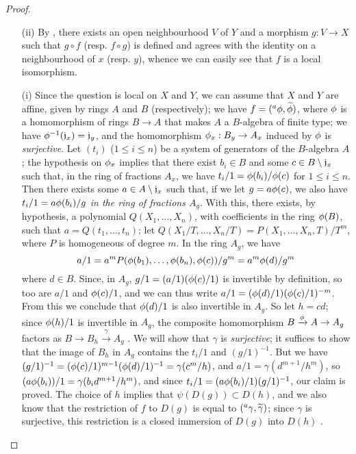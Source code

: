\begin{proof}
\label{proof-1.6.5.4}
\medskip\noindent
\begin{enumerate}
    \item[(ii)] By , there exists an open neighbourhood $V$ of $Y$ and a morphism $g:V\to X$ such that $g\circ f$ (resp. $f\circ g$) is defined and agrees with the identity on a neighbourhood of $x$ (resp. $y$), whence we can easily see that $f$ is a local isomorphism.
    \item[(i)] Since the question is local on $X$ and $Y$, we can assume that $X$ and $Y$ are affine, given by rings $A$ and $B$ (respectively);
    we have $f=({}^a\phi,\widetilde{\phi})$, where $\phi$ is a homomorphism of rings $B\to A$ that makes $A$ a $B$-algebra of finite type;
    we have $\phi^{-1}(\mathfrak{j}_x)=\mathfrak{j}_y$, and the homomorphism $\phi_x:B_y\to A_x$ induced by $\phi$ is \emph{surjective}.
    Let $(t_i)$ ($1\leqslant i\leqslant n$) be a system of generators of the $B$-algebra $A$;
    the hypothesis on $\phi_x$ implies that there exist $b_i\in B$ and some $c\in B\setminus\mathfrak{j}_x$ such that, in the ring of fractions $A_x$, we have $t_i/1=\phi(b_i)/\phi(c)$ for $1\leqslant i\leqslant n$.
    Then  there exists some $a\in A\setminus\mathfrak{j}_x$ such that, if we let $g=a\phi(c)$, we also have $t_i/1=a\phi(b_i)/g$ \emph{in the ring of fractions $A_g$}.
    With this, there exists, by hypothesis, a polynomial $Q(X_1,\ldots,X_n)$, with coefficients in the ring $\phi(B)$, such that $a=Q(t_1,\ldots,t_n)$;
    let $Q(X_1/T,\ldots,X_n/T)=P(X_1,\ldots,X_n,T)/T^m$, where $P$ is homogeneous of degree $m$.
    In the ring $A_g$, we have
    \[
      a/1=a^mP(\phi(b_1),\ldots,\phi(b_n),\phi(c))/g^m=a^m\phi(d)/g^m
    \]
    where $d\in B$.
    Since, in $A_g$, $g/1=(a/1)(\phi(c)/1)$ is invertible by definition, so too are $a/1$ and $\phi(c)/1$, and we can thus write $a/1=(\phi(d)/1)(\phi(c)/1)^{-m}$.
    From this we conclude that $\phi(d)/1$ is also invertible in $A_g$.
    So let $h=cd$;
    since $\phi(h)/1$ is invertible in $A_g$, the composite homomorphism $B\xrightarrow{\phi}A\to A_g$ factors as $B\to B_h\xrightarrow{\gamma}A_g$ .
    We will show that $\gamma$ is \emph{surjective};
    it suffices to show that the image of $B_h$ in $A_g$ contains the $t_i/1$ and $(g/1)^{-1}$.
    But we have $(g/1)^{-1}=(\phi(c)/1)^{m-1}(\phi(d)/1)^{-1}=\gamma(c^m/h)$, and $a/1=\gamma(d^{m+1}/h^m)$, so $(a\phi(b_i))/1=\gamma(b_id^{m+1}/h^m)$, and since $t_i/1=(a\phi(b_i)/1)(g/1)^{-1}$, our claim is proved.
    The choice of $h$ implies that $\psi(D(g))\subset D(h)$, and we also know that the restriction of $f$ to $D(g)$ is equal to $({}^a\gamma,\widetilde{\gamma})$;
    since $\gamma$ is surjective, this restriction is a closed immersion of $D(g)$ into $D(h)$ .
\end{enumerate}
\end{proof}

